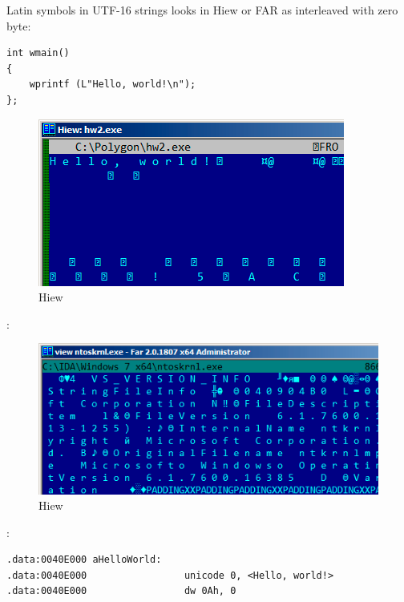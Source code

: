 {Latin symbols in UTF-16 strings looks in Hiew or FAR as interleaved with zero byte}:

\begin{lstlisting}
int wmain()
{
	wprintf (L"Hello, world!\n");
};
\end{lstlisting}

\begin{figure}[H]
\centering
\includegraphics[scale=0.66]{digging_into_code/strings/UTF16-string.png}
\caption{Hiew}
\end{figure}

:

\begin{figure}[H]
\centering
\includegraphics[scale=0.66]{digging_into_code/strings/ntoskrnl_UTF16.png}
\caption{Hiew}
\end{figure}

:

\begin{lstlisting}
.data:0040E000 aHelloWorld:
.data:0040E000                 unicode 0, <Hello, world!>
.data:0040E000                 dw 0Ah, 0
\end{lstlisting}

